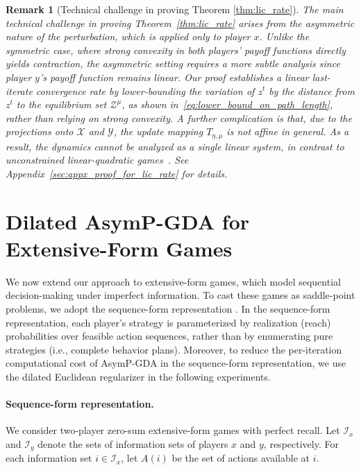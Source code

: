 \documentclass{article}
\newcommand{\X}{\mathcal{X}}
\newcommand{\Y}{\mathcal{Y}}
\newcommand{\Z}{\mathcal{Z}}
\theoremstyle{plain}
\newtheorem{remark}[theorem]{Remark}
\begin{document}
\begin{remark}[Technical challenge in proving Theorem \ref{thm:lic_rate}]
    \normalfont
    The main technical challenge in proving Theorem~\ref{thm:lic_rate} arises from the asymmetric nature of the perturbation, which is applied only to player $x$.
    Unlike the symmetric case, where strong convexity in both players’ payoff functions directly yields contraction, the asymmetric setting requires a more subtle analysis since player $y$'s payoff function remains linear.
    Our proof establishes a linear last-iterate convergence rate by lower-bounding the variation of $z^t$ by the distance from $z^t$ to the equilibrium set $\Z^{\mu}$, as shown in~\eqref{eq:lower_bound_on_path_length}, rather than relying on strong convexity.
    A further complication is that, due to the projections onto $\X$ and $\Y$, the update mapping $T_{\eta, \mu}$ is not affine in general.
    As a result, the dynamics cannot be analyzed as a single linear system, in contrast to unconstrained linear-quadratic games~\citep{zhang2022near}.
    See Appendix~\ref{sec:appx_proof_for_lic_rate} for details.
\end{remark}


\section{Dilated AsymP-GDA for Extensive-Form Games}
\label{sec:asymp_cfr+}
We now extend our approach to extensive-form games, which model sequential decision-making under imperfect information.
To cast these games as saddle-point problems, we adopt the sequence-form representation \citep{VONSTENGEL1996220}.
In the sequence-form representation, each player's strategy is parameterized by realization (reach) probabilities over feasible action sequences, rather than by enumerating pure strategies (i.e., complete behavior plans).
Moreover, to reduce the per-iteration computational cost of AsymP-GDA in the sequence-form representation, we use the dilated Euclidean regularizer \citep{hoda2010smoothing} in the following experiments.


\paragraph{Sequence-form representation.}
We consider two-player zero-sum extensive-form games with perfect recall.
Let $\mathcal{I}_x$ and $\mathcal{I}_y$ denote the sets of information sets of players $x$ and $y$, respectively.
For each information set $i\in \mathcal{I}_x$, let $A(i)$ be the set of actions available at $i$.
\end{document}
